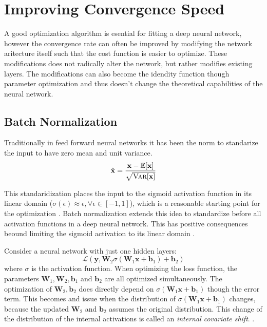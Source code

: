 \section{Improving Convergence Speed}

A good optimization algorithm is esential for fitting a deep neural network, however the convergence rate can often be improved by modifying the network aritecture itself such that the cost function is easier to optimize. These modifications does not radically alter the network, but rather modifies existing layers. The modifications can also become the idendity function though parameter optimization and thus doesn't change the theoretical capabilities of the neural network.

\subsection{Batch Normalization}
Traditionally in feed forward neural networks it has been the norm to standarize the input to have zero mean and unit variance.
\begin{equation}
\hat{\mathbf{x}} = \frac{\mathbf{x} - \mathbb{E}[\mathbf{x}]}{\sqrt{\textsc{Var}[\mathbf{x}]}}
\end{equation}

This standaridization places the input to the sigmoid activation function in its linear domain ($\sigma(\epsilon) \approx \epsilon, \forall \epsilon \in [-1, 1]$), which is a reasonable starting point for the optimization . Batch normalization extends this idea to standardize before all activation functions in a deep neural network. This has positive consequences beound limiting the sigmoid activation to its linear domain \cite{batch-normalization}.

Consider a neural network with just one hidden layers:
\begin{equation}
\mathcal{L}(\mathbf{y}, \mathbf{W}_2 \sigma(\mathbf{W}_1 \mathbf{x} + \mathbf{b}_1) + \mathbf{b}_2)
\end{equation}
where $\sigma$ is the activation function. When optimizing the loss function, the parameters $\mathbf{W}_1, \mathbf{W}_2, \mathbf{b}_1$ and $\mathbf{b}_2$ are all optimized simultaneously. The optimization of $\mathbf{W}_2, \mathbf{b}_2$ does directly depend on $\sigma(\mathbf{W}_1 \mathbf{x} + \mathbf{b}_1)$ though the error term. This becomes and issue when the distribution of $\sigma(\mathbf{W}_1 \mathbf{x} + \mathbf{b}_1)$ changes, because the updated $\mathbf{W}_2$ and $\mathbf{b}_2$ assumes the original distribution. This change of the distribution of the internal activations is called an \textit{internal covariate shift}. \cite{batch-normalization}.

